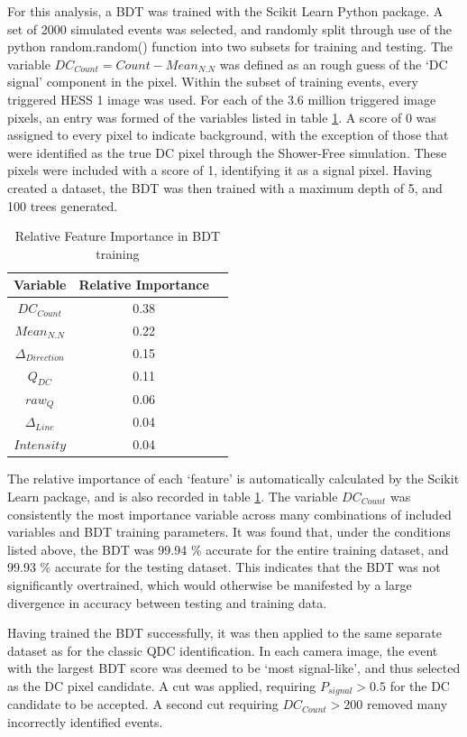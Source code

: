 \documentclass[]{article}
\begin{document}
For this analysis, a BDT was trained with the Scikit Learn Python package. A set of 2000 simulated events was selected, and randomly split through use of the python random.random() function into two subsets for training and testing. The variable $DC_{Count} = Count-Mean_{N.N}$ was defined as an rough guess of the \textquoteleft DC signal' component in the pixel. Within the subset of training events, every triggered HESS 1 image was used. For each of the 3.6 million triggered image pixels, an entry was formed of the variables listed in table \ref{tab:table2}. A score of 0 was assigned to every pixel to indicate background, with the exception of those that were identified as the true DC pixel through the Shower-Free simulation. These pixels were included with a score of 1, identifying it as a signal pixel. Having created a dataset, the BDT was then trained with a maximum depth of 5, and 100 trees generated.

\begin{table}[h!]
  \centering
  \caption{Relative Feature Importance in BDT training}
  \label{tab:table2}
  \begin{tabular}{ccc}
    \toprule
    Variable & Relative Importance\\
    \midrule
    $DC_{Count}$ & 0.38\\
    $Mean_{N.N}$ & 0.22\\
    $\Delta_{Direction}$ & 0.15\\
    $Q_{DC}$ & 0.11\\
    $raw_{Q}$ & 0.06\\
    $\Delta_{Line}$ & 0.04\\
    $Intensity$ & 0.04\\
    \bottomrule
  \end{tabular}
\end{table}

The relative importance of each \textquoteleft feature' is automatically calculated by the Scikit Learn package, and is also recorded in table \ref{tab:table2}. The variable $DC_{Count}$ was consistently the most importance variable across many combinations of included variables and BDT training parameters. It was found that, under the conditions listed above, the BDT was 99.94 \% accurate for the entire training dataset, and 99.93 \%  accurate for the testing dataset. This indicates that the BDT was not significantly overtrained, which would otherwise be manifested by a large divergence in accuracy between testing and training data.

Having trained the BDT successfully, it was then applied to the same separate dataset as for the classic QDC identification. In each camera image, the event with the largest BDT score was deemed to be \textquoteleft most signal-like', and thus selected as the DC pixel candidate. A cut was applied, requiring $P_{signal} > 0.5$ for the DC candidate to be accepted. A second cut requiring $DC_{Count} > 200$ removed many incorrectly identified events. 
\end{document}
